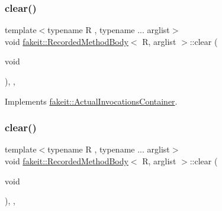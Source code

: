 \mbox{\label{classfakeit_1_1RecordedMethodBody_a6164a16c7813da2b7cd0d46568f1f1bc}} 
\subsubsection{\texorpdfstring{clear()}{clear()}\hspace{0.1cm}{\footnotesize\ttfamily [1/9]}}
{\footnotesize\ttfamily template$<$typename R , typename ... arglist$>$ \\
void \mbox{\hyperlink{classfakeit_1_1RecordedMethodBody}{fakeit\+::\+Recorded\+Method\+Body}}$<$ R, arglist $>$\+::clear (\begin{DoxyParamCaption}\item[{void}]{ }\end{DoxyParamCaption})\hspace{0.3cm}{\ttfamily [inline]}, {\ttfamily [override]}, {\ttfamily [virtual]}}



Implements \mbox{\hyperlink{structfakeit_1_1ActualInvocationsContainer_ab0af1e59028b53f8258b713f89bfdcbe}{fakeit\+::\+Actual\+Invocations\+Container}}.

\mbox{\label{classfakeit_1_1RecordedMethodBody_a6164a16c7813da2b7cd0d46568f1f1bc}} 
\subsubsection{\texorpdfstring{clear()}{clear()}\hspace{0.1cm}{\footnotesize\ttfamily [2/9]}}
{\footnotesize\ttfamily template$<$typename R , typename ... arglist$>$ \\
void \mbox{\hyperlink{classfakeit_1_1RecordedMethodBody}{fakeit\+::\+Recorded\+Method\+Body}}$<$ R, arglist $>$\+::clear (\begin{DoxyParamCaption}\item[{void}]{ }\end{DoxyParamCaption})\hspace{0.3cm}{\ttfamily [inline]}, {\ttfamily [override]}, {\ttfamily [virtual]}}



